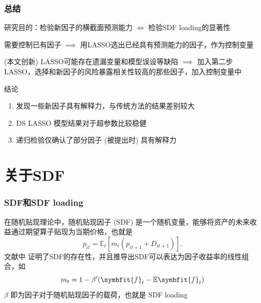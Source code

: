 \documentclass[
  UTF8,
  xcolor={dvipsnames,rgb},
  hyperref={colorlinks, citecolor=orange, linkcolor=black},
  aspectratio=169
  ]{beamer}
\begin{document}
\begin{frame}
    \frametitle{总结}

    \begin{wideitemize}
        \item 研究目的：检验新因子的横截面预测能力 \(\iff\) 检验SDF loading的显著性
        \item 需要控制已有因子 \(\implies\) 用LASSO选出已经具有预测能力的因子，作为控制变量
        \item (本文创新) LASSO可能存在遗漏变量和模型误设等缺陷 \(\implies\) 加入第二步LASSO，选择和新因子的风险暴露相关性较高的那些因子，加入控制变量中
        \item 结论 \begin{enumerate}
            \item 发现一些新因子具有解释力，与传统方法的结果差别较大
            \item DS LASSO 模型结果对于超参数比较稳健
            \item 递归检验仅确认了部分因子 (被提出时) 具有解释力
        \end{enumerate}
    \end{wideitemize}
\end{frame}

\appendix

\begin{frame}[allowframebreaks]
  \printbibliography
\end{frame}

\section{关于SDF}

\begin{frame}[label=appendix1]
    \frametitle{SDF和SDF loading}
    在随机贴现理论中，随机贴现因子 (SDF) 是一个随机变量，能够将资产的未来收益通过期望算子贴现为当期价格，也就是
    \[p_{it} = \mathbb{E}_t [m_t(p_{it+1}+D_{it+1})] .\]
    文献中 \parencite{Cochrane2009} 证明了SDF的存在性，并且推导出SDF可以表达为因子收益率的线性组合，如
    \[m_t=1-\beta'(\symbfit{f}_t-\mathbb{E}\symbfit{f}_t)\]
    \(\beta\) 即为因子对于随机贴现因子的载荷，也就是 SDF loading
\end{frame}
\end{document}
